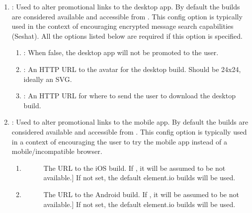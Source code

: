 \documentclass[letterpaper,10pt,openany,oneside,english]{sphinxmanual}
\begin{document}
\begin{enumerate}
\item {} 
\sphinxAtStartPar
{}: Used to alter promotional links to the desktop app. By default
the builds are considered available and accessible from . This
config option is typically used in the context of encouraging encrypted message
search capabilities (Seshat). All the options listed below are required if this
option is specified.
\begin{enumerate}
%
\item {} 
\sphinxAtStartPar
{}: When false, the desktop app will not be promoted to the user.

\item {} 
\sphinxAtStartPar
{}: An HTTP URL to the avatar for the desktop build. Should be 24x24, ideally
an SVG.

\item {} 
\sphinxAtStartPar
{}: An HTTP URL for where to send the user to download the desktop build.

\end{enumerate}

\item {} 
\sphinxAtStartPar
{}: Used to alter promotional links to the mobile app. By default the
builds are considered available and accessible from . This config
option is typically used in a context of encouraging the user to try the mobile app
instead of a mobile/incompatible browser.
\begin{enumerate}
%
\item {} \begin{description}
\item[{}] \leavevmode{[}The URL to the iOS build. If , it will be assumed to be not available.{]}
\sphinxAtStartPar
If not set, the default element.io builds will be used.

\end{description}

\item {} \begin{description}
\item[{}] \leavevmode{[}The URL to the Android build. If , it will be assumed to be not available.{]}
\sphinxAtStartPar
If not set, the default element.io builds will be used.


\end{description}
\end{enumerate}
\end{enumerate}
\end{document}
